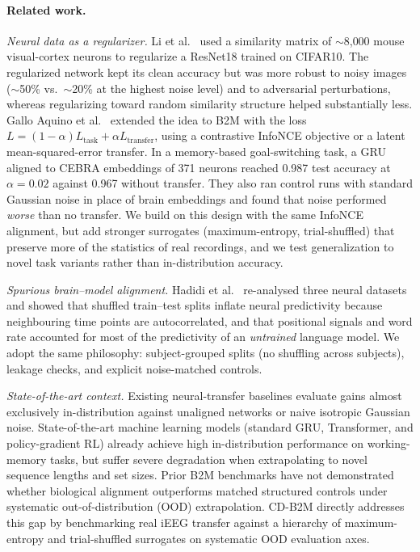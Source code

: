 \documentclass[conference]{IEEEtran}
\begin{document}
\paragraph{Related work.}
\emph{Neural data as a regularizer.} Li et al.~\cite{li2019brains} used a similarity matrix of $\sim$8{,}000 mouse visual-cortex neurons to regularize a ResNet18
trained on CIFAR10. The regularized network kept its clean accuracy but was more
robust to noisy images ($\sim$50\% vs.\ $\sim$20\% at the highest noise level) and to adversarial
perturbations, whereas regularizing toward random similarity structure helped
substantially less. Gallo Aquino et al.~\cite{aquino2025b2m} extended the idea to B2M with the loss $L=(1-\alpha)L_{\text{task}}+\alpha L_{\text{transfer}}$, using a contrastive InfoNCE
objective or a latent mean-squared-error transfer. In a
memory-based goal-switching task, a GRU aligned to CEBRA embeddings of
371 neurons reached 0.987 test accuracy at $\alpha=0.02$ against
0.967 without transfer. They also ran control runs with standard Gaussian noise in place of brain
embeddings and found that noise performed \emph{worse} than no transfer. We build on this
design with the same InfoNCE alignment, but add stronger surrogates
(maximum-entropy, trial-shuffled) that preserve more of the statistics of real recordings, and we test generalization to novel
task variants rather than in-distribution accuracy.

\emph{Spurious brain--model alignment.} Hadidi et
al.~\cite{hadidi2026spurious} re-analysed three neural datasets and showed that
shuffled train--test splits inflate neural predictivity because neighbouring time points are
autocorrelated, and that positional signals and word rate accounted for most of the predictivity of an \emph{untrained} language model. We adopt the same philosophy: subject-grouped splits (no shuffling
across subjects), leakage checks, and explicit noise-matched controls.

\emph{State-of-the-art context.} Existing neural-transfer baselines evaluate gains almost exclusively in-distribution against unaligned networks or naive isotropic Gaussian noise. State-of-the-art machine learning models (standard GRU, Transformer, and policy-gradient RL) already achieve high in-distribution performance on working-memory tasks, but suffer severe degradation when extrapolating to novel sequence lengths and set sizes. Prior B2M benchmarks have not demonstrated whether biological alignment outperforms matched structured controls under systematic out-of-distribution (OOD) extrapolation. CD-B2M directly addresses this gap by benchmarking real iEEG transfer against a hierarchy of maximum-entropy and trial-shuffled surrogates on systematic OOD evaluation axes.
\end{document}
